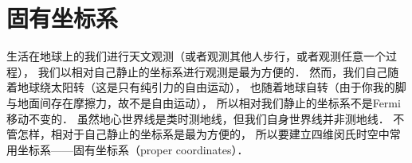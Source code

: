 %
%
%
%


\section{固有坐标系}\label{chfd:sec_proper-coord}
生活在地球上的我们进行天文观测（或者观测其他人步行，或者观测任意一个过程），
我们以相对自己静止的坐标系进行观测是最为方便的．
然而，我们自己随着地球绕太阳转（这是只有纯引力的自由运动），
也随着地球自转（由于你我的脚与地面间存在摩擦力，故不是自由运动），
所以相对我们静止的坐标系不是Fermi移动不变的．
虽然地心世界线是类时测地线，但我们自身世界线并非测地线．
不管怎样，相对于自己静止的坐标系是最为方便的，
所以要建立四维闵氏时空中常用坐标系——{\heiti 固有坐标系}\cite[\S 13.6]{mtw1973}（proper coordinates）．

